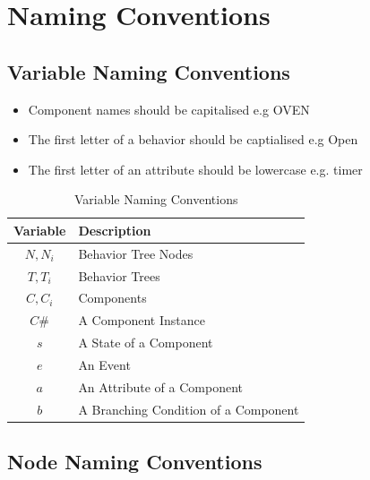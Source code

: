 \documentclass[]{article}
\begin{document}
\section{Naming Conventions}

\subsection{Variable Naming Conventions}

\begin{itemize}
\item Component names should be capitalised e.g OVEN
\item The first letter of a behavior should be captialised e.g Open
\item The first letter of an attribute should be lowercase e.g. timer
\end{itemize}

\begin{table}[hb]
 \begin{center}
 \begin{small}
 \begin{tabular}{|c|l|}
 \hline
 \textbf{Variable} & \textbf{Description} \\ 
 \hline
 \hline
 $N,N_i$ & Behavior Tree Nodes \\ 
 \hline
 $T,T_i$ & Behavior Trees \\ 
 \hline
 $C,C_i$ & Components \\ 
 \hline
 $C\#$ & A Component Instance \\ 
 \hline
 $s$ & A State of a Component \\ 
 \hline
 $e$ & An Event \\ 
 \hline
 $a$ & An Attribute of a Component \\ 
 \hline
 $b$ & A Branching Condition of a Component \\ 
 \hline
 \end{tabular}
 \end{small}
 \end{center}
 \caption{Variable Naming Conventions}
 \label{Variable Naming Conventions}
\end{table}

\clearpage

\subsection{Node Naming Conventions}
\end{document}
